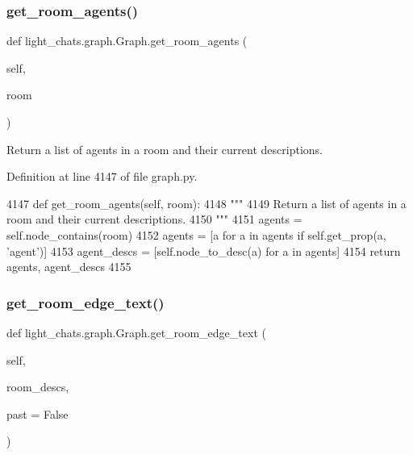 \subsubsection{\texorpdfstring{get\+\_\+room\+\_\+agents()}{get\_room\_agents()}}
{\footnotesize\ttfamily def light\+\_\+chats.\+graph.\+Graph.\+get\+\_\+room\+\_\+agents (\begin{DoxyParamCaption}\item[{}]{self,  }\item[{}]{room }\end{DoxyParamCaption})}

\begin{DoxyVerb}Return a list of agents in a room and their current descriptions.
\end{DoxyVerb}
 

Definition at line 4147 of file graph.\+py.


\begin{DoxyCode}
4147     \textcolor{keyword}{def }get\_room\_agents(self, room):
4148         \textcolor{stringliteral}{"""}
4149 \textcolor{stringliteral}{        Return a list of agents in a room and their current descriptions.}
4150 \textcolor{stringliteral}{        """}
4151         agents = self.node\_contains(room)
4152         agents = [a \textcolor{keywordflow}{for} a \textcolor{keywordflow}{in} agents \textcolor{keywordflow}{if} self.get\_prop(a, \textcolor{stringliteral}{'agent'})]
4153         agent\_descs = [self.node\_to\_desc(a) \textcolor{keywordflow}{for} a \textcolor{keywordflow}{in} agents]
4154         \textcolor{keywordflow}{return} agents, agent\_descs
4155 
\end{DoxyCode}
\mbox{\label{classlight__chats_1_1graph_1_1Graph_a2588a6f893b108eb25c9125db8036c0a}} 
\subsubsection{\texorpdfstring{get\+\_\+room\+\_\+edge\+\_\+text()}{get\_room\_edge\_text()}}
{\footnotesize\ttfamily def light\+\_\+chats.\+graph.\+Graph.\+get\+\_\+room\+\_\+edge\+\_\+text (\begin{DoxyParamCaption}\item[{}]{self,  }\item[{}]{room\+\_\+descs,  }\item[{}]{past = {\ttfamily False} }\end{DoxyParamCaption})}

